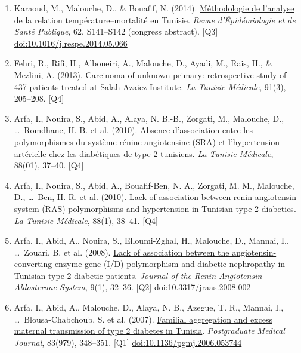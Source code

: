 \documentclass[10pt,a4paper]{article}
\newcommand{\doi}[1]{\href{https://doi.org/#1}{doi:#1}}
\newcommand{\Qu}[1]{[Q#1]}
\begin{document}
\begin{enumerate}[resume*]
\item Karaoud, M., Malouche, D., \& Bouafif, N. (2014). \href{https://www.em-consulte.com/article/911552/article/methodologie-de-l-analyse-de-la-relation-temperatu}{M\'ethodologie de l'analyse de la relation temp\'erature--mortalit\'e en Tunisie}. \emph{Revue d'\'Epid\'emiologie et de Sant\'e Publique}, 62, S141--S142 (congress abstract). \Qu3 \doi{10.1016/j.respe.2014.05.066}
\item Fehri, R., Rifi, H., Alboueiri, A., Malouche, D., Ayadi, M., Rais, H., \& Mezlini, A. (2013). \href{https://pubmed.ncbi.nlm.nih.gov/23588636/}{Carcinoma of unknown primary: retrospective study of 437 patients treated at Salah Azaiez Institute}. \emph{La Tunisie M\'edicale}, 91(3), 205--208. \Qu4
\item Arfa, I., Nouira, S., Abid, A., Alaya, N. B.-B., Zorgati, M., Malouche, D., \ldots\ Romdhane, H. B. et al. (2010). Absence d'association entre les polymorphismes du syst\`eme r\'enine angiotensine (SRA) et l'hypertension art\'erielle chez les diab\'etiques de type 2 tunisiens. \emph{La Tunisie M\'edicale}, 88(01), 37--40. \Qu4
\item Arfa, I., Nouira, S., Abid, A., Bouafif-Ben, N. A., Zorgati, M. M., Malouche, D., \ldots\ Ben, H. R. et al. (2010). \href{https://pubmed.ncbi.nlm.nih.gov/20415212/}{Lack of association between renin-angiotensin system (RAS) polymorphisms and hypertension in Tunisian type 2 diabetics}. \emph{La Tunisie M\'edicale}, 88(1), 38--41. \Qu4
\item Arfa, I., Abid, A., Nouira, S., Elloumi-Zghal, H., Malouche, D., Mannai, I., \ldots\ Zouari, B. et al. (2008). \href{https://doi.org/10.3317/jraas.2008.002}{Lack of association between the angiotensin-converting enzyme gene (I/D) polymorphism and diabetic nephropathy in Tunisian type 2 diabetic patients}. \emph{Journal of the Renin-Angiotensin-Aldosterone System}, 9(1), 32--36. \Qu2 \doi{10.3317/jraas.2008.002}
\item Arfa, I., Abid, A., Malouche, D., Alaya, N. B., Azegue, T. R., Mannai, I., \ldots\ Blousa-Chabchoub, S. et al. (2007). \href{https://pmc.ncbi.nlm.nih.gov/articles/PMC2600082/}{Familial aggregation and excess maternal transmission of type 2 diabetes in Tunisia}. \emph{Postgraduate Medical Journal}, 83(979), 348--351. \Qu1 \doi{10.1136/pgmj.2006.053744}


\end{enumerate}
\end{document}

